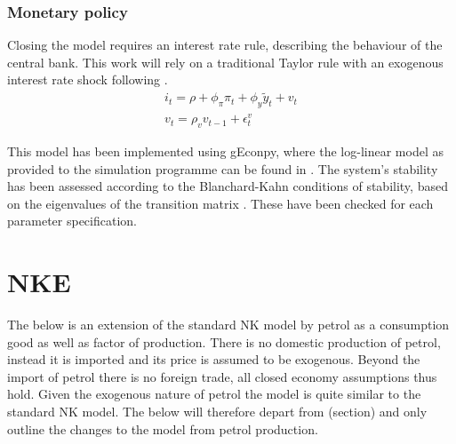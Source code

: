 \documentclass[12pt,a4paper,english]{article} %
\let\oldsection\section
\renewcommand\section{\clearpage\oldsection}
\begin{document}
	\subsubsection{Monetary policy}
	Closing the model requires an interest rate rule, describing the behaviour of the central bank. This work will rely on a traditional Taylor rule with an exogenous interest rate shock following \cite{gali_monetary_2008}.
	\begin{equation}
		\begin{aligned}
			i_t = \rho + \phi_{\pi} \pi_t + \phi_{y} \tilde{y}_t + v_t \\
			v_t = \rho_v v_{t-1} + \epsilon_t^v
		\end{aligned}
	\end{equation}

	This model has been implemented using gEconpy, where the log-linear model as provided to the simulation programme can be found in . The system's stability has been assessed according to the Blanchard-Kahn conditions of stability, based on the eigenvalues of the transition matrix \cite{blanchard_solution_1980}. These have been checked for each parameter specification.

	\section{NKE}
	The below is an extension of the standard NK model by petrol as a consumption good as well as factor of production. There is no domestic production of petrol, instead it is imported and its price is assumed to be exogenous. Beyond the import of petrol there is no foreign trade, all closed economy assumptions thus hold. 
	Given the exogenous nature of petrol the model is quite similar to the standard NK model. The below will therefore depart from (section) and only outline the changes to the model from petrol production. 	
	
\end{document}
